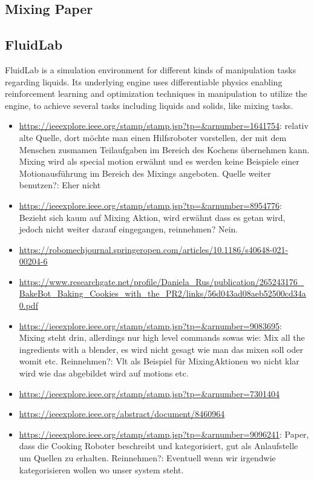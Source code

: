 \subsection*{Mixing Paper}
\subsection*{FluidLab}
FluidLab is a simulation environment for different kinds of manipulation tasks regarding liquids. Its underlying engine uses differentiable physics 
enabling reinforcement learning and optimization techniques in manipulation to utilize the engine, to achieve several tasks 
including liquids and solids, like mixing tasks. 

\newpage
\begin{itemize}
    \item \url{https://ieeexplore.ieee.org/stamp/stamp.jsp?tp=&arnumber=1641754}: relativ alte Quelle, dort möchte man einen Hilfsroboter vorstellen, der mit dem Menschen zusmamen Teilaufgaben im Bereich des Kochens übernehmen kann. Mixing wird als special motion erwähnt und es werden keine Beispiele einer Motionausführung im Bereich des Mixings angeboten. Quelle weiter benutzen?: Eher nicht
    \item \url{https://ieeexplore.ieee.org/stamp/stamp.jsp?tp=&arnumber=8954776}: Bezieht sich kaum auf Mixing Aktion, wird erwähnt dass es getan wird, jedoch nicht weiter darauf eingegangen, reinnehmen? Nein.
    \item \url{https://robomechjournal.springeropen.com/articles/10.1186/s40648-021-00204-6}
    \item \url{https://www.researchgate.net/profile/Daniela_Rus/publication/265243176_BakeBot_Baking_Cookies_with_the_PR2/links/56d043ad08aeb52500cd34a0.pdf}
    \item \url{https://ieeexplore.ieee.org/stamp/stamp.jsp?tp=&arnumber=9083695}: Mixing steht drin, allerdings nur high level commands sowas wie: Mix all the ingredients with a blender, es wird nicht gesagt wie man das mixen soll oder womit etc. Reinnehmen?: Vlt als Beispiel für MixingAktionen wo nicht klar wird wie das abgebildet wird auf motions etc.
    \item \url{https://ieeexplore.ieee.org/stamp/stamp.jsp?tp=&arnumber=7301404}
    \item \url{https://ieeexplore.ieee.org/abstract/document/8460964}
    \item \url{https://ieeexplore.ieee.org/stamp/stamp.jsp?tp=&arnumber=9096241}: Paper, dass die Cooking Roboter beschreibt und kategorisiert, gut als Anlaufstelle um Quellen zu erhalten. Reinnehmen?: Eventuell wenn wir irgendwie kategorisieren wollen wo unser system steht.

\end{itemize}
